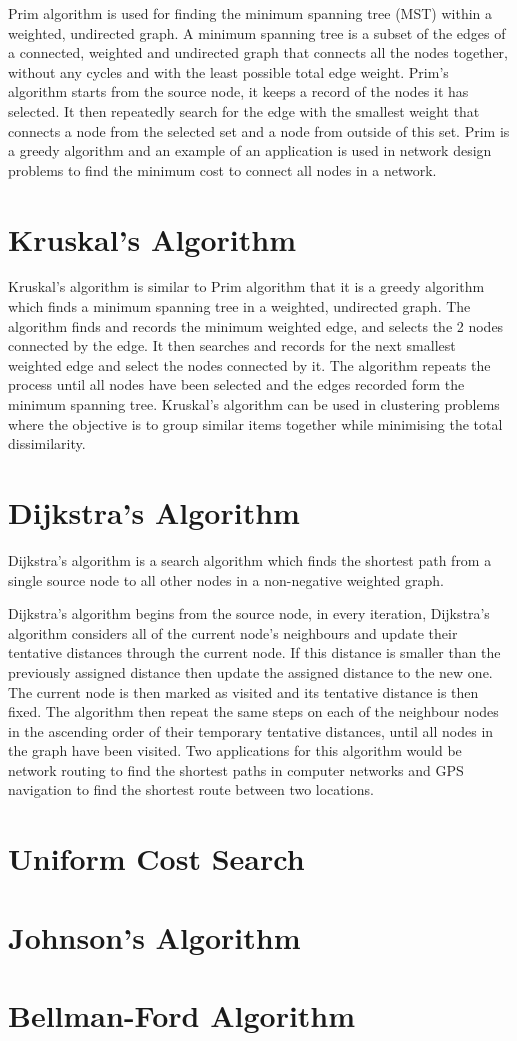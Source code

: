 Prim algorithm is used for finding the minimum spanning tree (MST) within a weighted, undirected graph. A minimum spanning tree is a subset of the edges of a connected, weighted and undirected graph that connects all the nodes together, without any cycles and with the least possible total edge weight. Prim's algorithm starts from the source node, it keeps a record of the nodes it has selected. It then repeatedly search for the edge with the smallest weight that connects a node from the selected set and a node from outside of this set. Prim is a greedy algorithm and an example of an application is used in network design problems to find the minimum cost to connect all nodes in a network.

\section{Kruskal's Algorithm}

Kruskal's algorithm is similar to Prim algorithm that it is a greedy algorithm which finds a minimum spanning tree in a weighted, undirected graph. The algorithm finds and records the minimum weighted edge, and selects the 2 nodes connected by the edge. It then searches and records for the next smallest weighted edge and select the nodes connected by it. The algorithm repeats the process until all nodes have been selected and the edges recorded form the minimum spanning tree. Kruskal's algorithm can be used in clustering problems where the objective is to group similar items together while minimising the total dissimilarity.

\section{Dijkstra's Algorithm} \label{dijkstra}

Dijkstra's algorithm is a search algorithm which finds the shortest path from a single source node to all other nodes in a non-negative weighted graph.

Dijkstra's algorithm begins from the source node, in every iteration, Dijkstra's algorithm considers all of the current node's neighbours and update their tentative distances through the current node. If this distance is smaller than the previously assigned distance then update the assigned distance to the new one. The current node is then marked as visited and its tentative distance is then fixed. The algorithm then repeat the same steps on each of the neighbour nodes in the ascending order of their temporary tentative distances, until all nodes in the graph have been visited. Two applications for this algorithm would be network routing to find the shortest paths in computer networks and GPS navigation to find the shortest route between two locations.

\section{Uniform Cost Search}

\section{Johnson's Algorithm}

\section{Bellman-Ford Algorithm}
